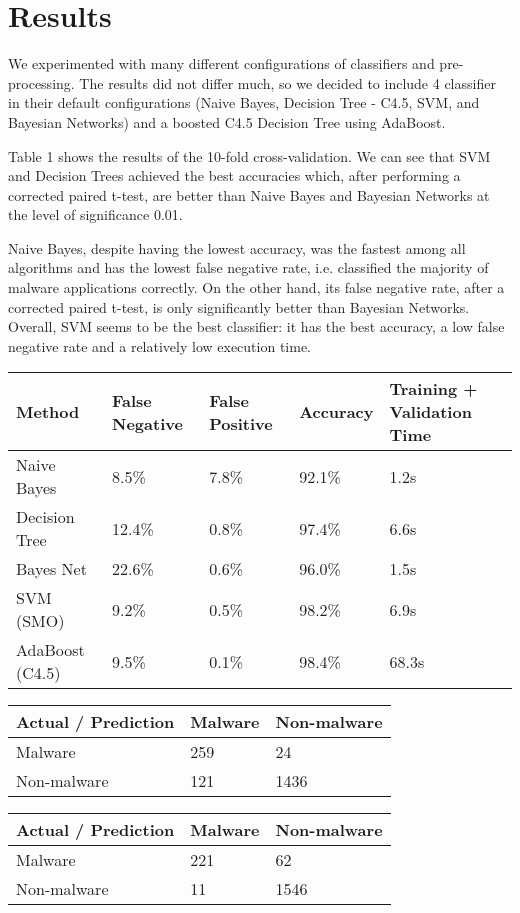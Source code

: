 \section{Results}
We experimented with many different configurations of classifiers and pre-processing. The results did not differ much, so we decided to include 4 classifier in their default configurations (Naive Bayes, Decision Tree - C4.5, SVM, and Bayesian Networks) and a boosted C4.5 Decision Tree using AdaBoost.

Table 1 shows the results of the 10-fold cross-validation. We can see that SVM and Decision Trees achieved the best accuracies which, after performing a corrected paired t-test, are better than Naive Bayes and Bayesian Networks at the level of significance 0.01.

Naive Bayes, despite having the lowest accuracy, was the fastest among all algorithms and has the lowest false negative rate, i.e. classified the majority of malware applications correctly. On the other hand, its false negative rate, after a corrected paired t-test, is only significantly better than Bayesian Networks. Overall, SVM seems to be the best classifier: it has the best accuracy, a low false negative rate and a relatively low execution time.
\begin{tabular}{|l|l l l l|}
\hline
Method & False Negative & False Positive & Accuracy & Training + Validation Time \\
\hline
Naive Bayes & 8.5\% & 7.8\% & 92.1\% & 1.2s \\
Decision Tree & 12.4\% & 0.8\% & 97.4\% & 6.6s \\
Bayes Net & 22.6\% & 0.6\% & 96.0\% & 1.5s \\
SVM (SMO) & 9.2\% & 0.5\% & 98.2\% & 6.9s \\
AdaBoost (C4.5) & 9.5\% & 0.1\% & 98.4\% & 68.3s \\
\hline
\end{tabular}
\begin{tabular}{|l|l l|}
\hline
Actual / Prediction & Malware & Non-malware \\
\hline
Malware & 259 & 24 \\
Non-malware & 121 & 1436 \\
\hline
\end{tabular}
\begin{tabular}{|l|l l|}
\hline
Actual / Prediction & Malware & Non-malware \\
\hline
Malware & 221 & 62 \\
Non-malware & 11 & 1546 \\
\hline
\end{tabular}
